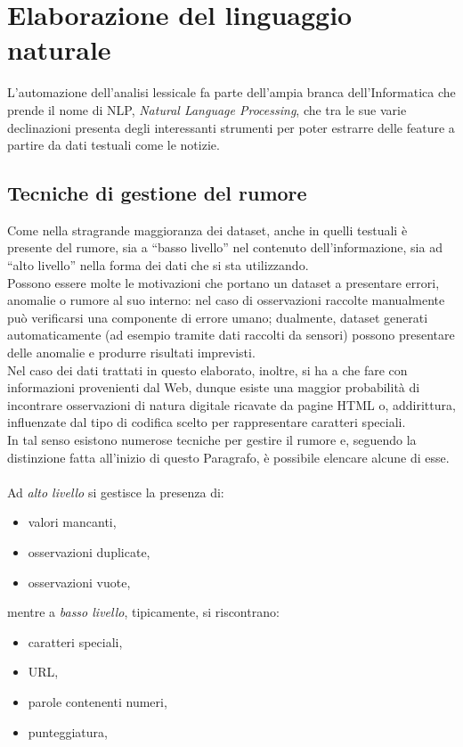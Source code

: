 \documentclass[12pt]{report}
\theoremstyle{definition}
\begin{document}
\section{Elaborazione del linguaggio naturale} \label{nlp}
L'automazione dell'analisi lessicale fa parte dell'ampia branca dell'Informatica che prende il nome di NLP, \textit{Natural Language Processing}, che tra le sue varie declinazioni presenta degli interessanti strumenti per poter estrarre delle feature a partire da dati testuali come le notizie.


\subsection{Tecniche di gestione del rumore} \label{clean}
Come nella stragrande maggioranza dei dataset, anche in quelli testuali è presente del rumore, sia a ``basso livello'' nel contenuto dell'informazione, sia ad ``alto livello'' nella forma dei dati che si sta utilizzando.
\\
Possono essere molte le motivazioni che portano un dataset a presentare errori, anomalie o rumore al suo interno: 
nel caso di osservazioni raccolte manualmente può verificarsi una componente di errore umano; dualmente, dataset generati automaticamente (ad esempio tramite dati raccolti da sensori) possono presentare delle anomalie e produrre risultati imprevisti.
\\
Nel caso dei dati trattati in questo elaborato, inoltre, si ha a che fare con informazioni provenienti dal Web, dunque esiste una maggior probabilità di incontrare osservazioni di natura digitale ricavate da pagine HTML o, addirittura, influenzate dal tipo di codifica scelto per rappresentare caratteri speciali.
\\
In tal senso esistono numerose tecniche per gestire il rumore e, seguendo la distinzione fatta all'inizio di questo Paragrafo, è possibile elencare alcune di esse.
\\
\\
Ad \textit{alto livello} si gestisce la presenza di:
\begin{itemize}
    \item valori mancanti,
    \item osservazioni duplicate,
    \item osservazioni vuote,
\end{itemize}

mentre a \textit{basso livello}, tipicamente, si riscontrano:
\begin{itemize}
    \item caratteri speciali,
    \item URL,
    \item parole contenenti numeri,
    \item punteggiatura,
\end{itemize}
\end{document}
